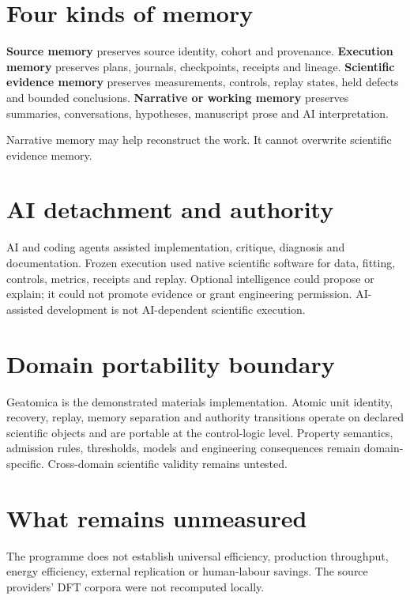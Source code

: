 \documentclass[11pt,a4paper,oneside]{report}
\begin{document}
\section{Four kinds of memory}
\textbf{Source memory} preserves source identity, cohort and provenance.
\textbf{Execution memory} preserves plans, journals, checkpoints, receipts and lineage.
\textbf{Scientific evidence memory} preserves measurements, controls, replay states,
held defects and bounded conclusions. \textbf{Narrative or working memory} preserves
summaries, conversations, hypotheses, manuscript prose and AI interpretation.

\begin{governingrule}
Narrative memory may help reconstruct the work. It cannot overwrite scientific evidence
memory.
\end{governingrule}

\section{AI detachment and authority}
AI and coding agents assisted implementation, critique, diagnosis and documentation.
Frozen execution used native scientific software for data, fitting, controls, metrics,
receipts and replay. Optional intelligence could propose or explain; it could not promote
evidence or grant engineering permission. AI-assisted development is not AI-dependent
scientific execution.

\section{Domain portability boundary}
Geatomica is the demonstrated materials implementation. Atomic unit identity, recovery,
replay, memory separation and authority transitions operate on declared scientific
objects and are portable at the control-logic level. Property semantics, admission rules,
thresholds, models and engineering consequences remain domain-specific. Cross-domain
scientific validity remains untested.



\section{What remains unmeasured}
The programme does not establish universal efficiency, production throughput, energy
efficiency, external replication or human-labour savings. The source providers' DFT
corpora were not recomputed locally.
\end{document}
